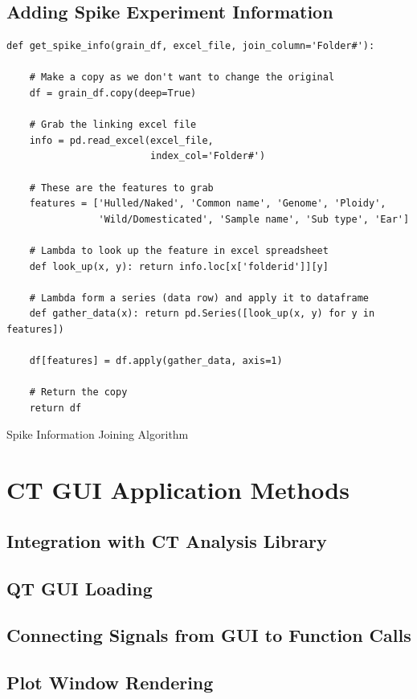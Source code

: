 \documentclass[11pt]{report}
\begin{document}
\subsection{Adding Spike Experiment Information}
\label{sec:orga5d8e1d}
\begin{listing}[htbp]
\begin{verbatim}
def get_spike_info(grain_df, excel_file, join_column='Folder#'):

    # Make a copy as we don't want to change the original
    df = grain_df.copy(deep=True)

    # Grab the linking excel file
    info = pd.read_excel(excel_file,
                         index_col='Folder#')

    # These are the features to grab
    features = ['Hulled/Naked', 'Common name', 'Genome', 'Ploidy',
                'Wild/Domesticated', 'Sample name', 'Sub type', 'Ear']

    # Lambda to look up the feature in excel spreadsheet
    def look_up(x, y): return info.loc[x['folderid']][y]

    # Lambda form a series (data row) and apply it to dataframe
    def gather_data(x): return pd.Series([look_up(x, y) for y in features])

    df[features] = df.apply(gather_data, axis=1)

    # Return the copy
    return df
\end{verbatim}
\caption{\label{orgc6a528e}
Spike Information Joining Algorithm}
\end{listing}

\section{CT GUI Application Methods}
\label{sec:orga173d39}
\subsection{Integration with CT Analysis Library}
\label{sec:org7738fd0}
\subsection{QT GUI Loading}
\label{sec:org1529718}
\subsection{Connecting Signals from GUI to Function Calls}
\label{sec:org33ce209}
\subsection{Plot Window Rendering}
\label{sec:org7195b1e}
\end{document}
